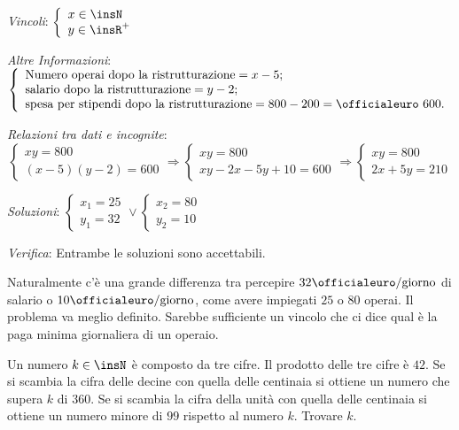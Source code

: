\emph{Vincoli}: $\left\{\begin{array}{l}x\in \insN\\y\in \insR^+\end{array}\right.$

\emph{Altre Informazioni}: $ \left\{\begin{array}{l}
\text{Numero operai dopo la ristrutturazione} = x-5;\\
\text{salario dopo la ristrutturazione} =y-2;\\
\text{spesa per stipendi dopo la ristrutturazione} =800-200=\text{\officialeuro~}600.\end{array}\right.$

\emph{Relazioni tra dati e incognite}:
\begin{equation*}
\left\{\begin{array}{l}{{xy}=800}\\{(x-5)(y-2)=600}\end{array}\right.\Rightarrow \left\{\begin{array}{l}{{xy}=800}\\{{xy}-2x-5y+10=600}\end{array}\right.\Rightarrow \left\{\begin{array}{l}{{xy}=800}\\{2x+5y=210}\end{array}\right.
\end{equation*}

\emph{Soluzioni}: $\left\{\begin{array}{l}{x_1=25}\\{y_1=32}\end{array}\right.\vee \left\{\begin{array}{l}{x_2=80}\\{y_2=10}\end{array}\right.$

\emph{Verifica}: Entrambe le soluzioni sono accettabili.

Naturalmente c'è una grande differenza tra percepire $32\unit{\text{\officialeuro/giorno}}$ di salario o $ 10\unit{\text{\officialeuro/giorno}}$, come avere impiegati $25$ o $80$ operai. Il problema va meglio definito. Sarebbe sufficiente un vincolo che ci dice qual è la paga minima giornaliera di un operaio.

\begin{problema}
Un numero $k\in \insN$ è composto da tre cifre. Il prodotto delle tre cifre è $42$. Se si scambia la cifra delle decine con quella delle centinaia si ottiene un numero che supera $k$ di $360$. Se si scambia la cifra della unità con quella delle centinaia si ottiene un numero minore di $99$ rispetto al numero $k$. Trovare $k$.
\end{problema}

